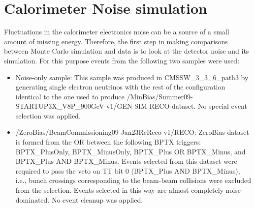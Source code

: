 \section{Calorimeter Noise simulation}
\label{sc:CaloNoise}

Fluctuations in the calorimeter electronics noise can be a source of a small amount of missing energy. Therefore, the first step
in making comparisons between Monte Carlo simulation and data is to look at the detector noise and its simulation. For this purpose
events from the following two samples were used:

\begin{itemize}
  \item Noise-only sample: \newline
This sample was produced in CMSSW\_3\_3\_6\_path3 by generating single electron neutrinos with the rest of the configuration identical to the one used to
produce /MinBias/Summer09-STARTUP3X\_V8P\_900GeV-v1/GEN-SIM-RECO dataset. No special event selection was applied.

  \item /ZeroBias/BeamCommissioning09-Jan23ReReco-v1/RECO: \newline
ZeroBias dataset is formed from the OR between the following BPTX triggers: BPTX\_PlusOnly, BPTX\_MinusOnly, BPTX\_Plus
OR BPTX\_Minus, and BPTX\_Plus AND BPTX\_Minus. Events selected from this dataset were required to pass the
veto on TT bit 0 (BPTX\_Plus AND BPTX\_Minus), i.e., bunch crossings corresponding to the beam-beam
collisions were excluded from the selection. Events selected in this way are almost completely noise-dominated. No event cleanup was applied.
\end{itemize}

